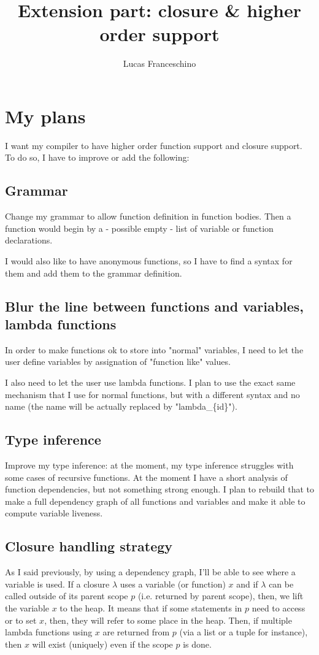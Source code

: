 \documentclass{article}
\author{Lucas Franceschino}
\title{Extension part: closure \& higher order support}
\begin{document}
	\maketitle
	\section{My plans}
		I want my compiler to have higher order function support and closure support. To do so, I have to improve or add the following:
		\subsection{Grammar}
			Change my grammar to allow function definition in function bodies. Then a function would begin by a - possible empty - list of variable or function declarations.

			I would also like to have anonymous functions, so I have to find a syntax for them and add them to the grammar definition.
		\subsection{Blur the line between functions and variables, lambda functions}
			In order to make functions ok to store into "normal" variables, I need to let the user define variables by assignation of "function like" values.

			I also need to let the user use lambda functions. I plan to use the exact same mechanism that I use for normal functions, but with a different syntax and no name (the name will be actually replaced by "lambda\_\{id\}"). 

		\subsection{Type inference}
			Improve my type inference: at the moment, my type inference struggles with some cases of recursive functions.
			At the moment I have a short analysis of function dependencies, but not something strong enough. I plan to rebuild that to make a full dependency graph of all functions and variables and make it able to compute variable liveness.

		\subsection{Closure handling strategy}
			As I said previously, by using a dependency graph, I'll be able to see where a variable is used. If a closure $\lambda$ uses a variable (or function) $x$ and if $\lambda$ can be called outside of its parent scope $p$ (i.e. returned by parent scope), then, we lift the variable $x$ to the heap. It means that if some statements in $p$ need to access or to set $x$, then, they will refer to some place in the heap. Then, if multiple lambda functions using $x$ are returned from $p$ (via a list or a tuple for instance), then $x$ will exist (uniquely) even if the scope $p$ is done.
\end{document}
